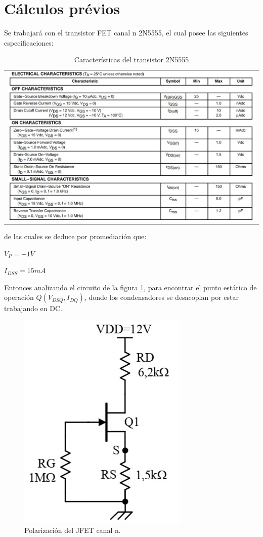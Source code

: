 \documentclass[12pt, a4paper]{article}
\begin{document}
    \newpage

    \section{Cálculos prévios}

    Se trabajará con el transistor FET canal n 2N5555, el cual posee las siguientes especificaciones:
    
    \begin{table}[h!]
        \centering
        \caption{Características del transistor 2N5555} %
        \label{tab:5555} %
        \begin{tabular}{c}
            \includegraphics[width=16cm\textwidth]{2N5555.jpg} \\
        \end{tabular}
    \end{table}
    
    de las cuales se deduce por promediación que:

    $V_P = -1V$

    $I_{DSS} = 15mA$

    Entonces analizando el circuito de la figura \ref{fig:cir1}, para encontrar el punto estático de operación $Q(V_{DSQ},I_{DQ})$, donde los condensadores se desacoplan por estar trabajando en DC.

    \begin{figure}[h!]
        \centering
        \includegraphics[height=5cm\textwidth]{circuito1.jpg}
        \caption{Polarización del JFET canal n.}
        \label{fig:cir1}
    \end{figure}
\end{document}
